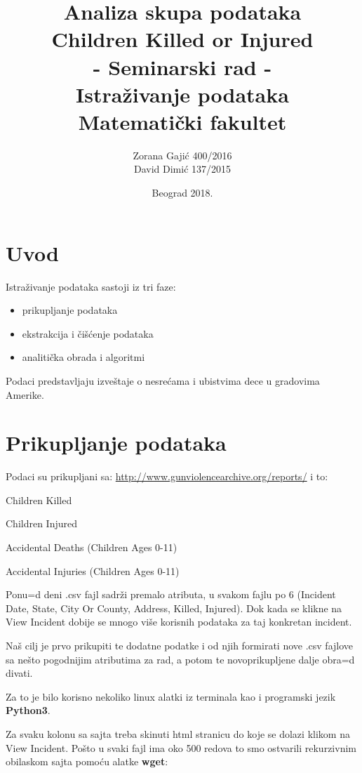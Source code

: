 \documentclass[12pt, a4paper]{article}
\title{\textbf{Analiza skupa podataka\\ Children Killed or Injured\\}- Seminarski rad - \\Istra\v zivanje podataka \\ Matemati\v cki fakultet}
\author{Zorana Gaji\' c 400/2016 \\ David Dimi\' c 137/2015}
\date{Beograd 2018.}
\def\dj{\leavevmode\setbox0=\hbox{d}\kern0pt
\rlap{\kern.215em\raise.46\ht0\hbox{-}}d}
\begin{document}
\begin{titlepage}
\maketitle
\thispagestyle{empty}
\end{titlepage}

\tableofcontents
\clearpage


\section {Uvod}
Istra\v zivanje podataka sastoji iz tri faze:
\begin{itemize}
\item prikupljanje podataka
\item ekstrakcija i \v ci\v s\' cenje podataka
\item analiti\v cka obrada i algoritmi
\end{itemize}

Podaci predstavljaju izve\v staje o nesre\' cama i ubistvima dece u gradovima Amerike. 
\break 


\section {Prikupljanje podataka}
Podaci su prikupljani sa: \url{http://www.gunviolencearchive.org/reports/}
i to: \begin{list}{•}{}
\item Children Killed
\item Children Injured
\item Accidental Deaths (Children Ages 0-11)
\item Accidental Injuries (Children Ages 0-11)
\end{list}

Ponu\dj eni .csv fajl sadr\v zi premalo atributa, u svakom fajlu po 6 (Incident Date, State, City Or County, Address, Killed, Injured). Dok kada se klikne na View Incident dobije se mnogo vi\v se korisnih podataka za taj konkretan incident. 
\break 

Na\v s cilj je prvo prikupiti te dodatne podatke i od njih formirati nove .csv fajlove sa ne\v sto pogodnijim atributima za rad, a potom te novoprikupljene dalje obra\dj ivati.

Za to je bilo korisno nekoliko linux alatki iz terminala kao i programski jezik \textbf{Python3}.

Za svaku kolonu sa sajta treba skinuti html stranicu do koje se dolazi klikom na View Incident. Po\v sto u svaki fajl ima oko 500 redova to smo ostvarili rekurzivnim obilaskom sajta pomo\' cu alatke \textbf{wget}:
\end{document}
